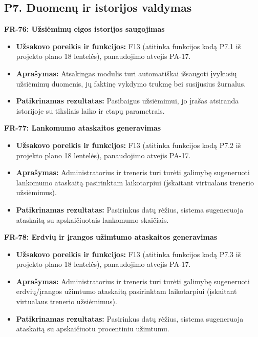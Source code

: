 \subsection{P7. Duomenų ir istorijos valdymas}

\vspace{0.3cm}
\noindent\textbf{FR-76: Užsiėmimų eigos istorijos saugojimas}
\begin{itemize}
    \item \textbf{Užsakovo poreikis ir funkcijos:} F13 (atitinka funkcijos kodą P7.1 iš projekto plano 18 lentelės), panaudojimo atvejis PA-17.
    \item \textbf{Aprašymas:} Atsakingas modulis turi automatiškai išsaugoti įvykusių užsiėmimų duomenis, jų faktinę vykdymo trukmę bei susijusius žurnalus.
    \item \textbf{Patikrinamas rezultatas:} Pasibaigus užsiėmimui, jo įrašas atsiranda istorijoje su tiksliais laiko ir etapų parametrais.
\end{itemize}

\vspace{0.3cm}
\noindent\textbf{FR-77: Lankomumo ataskaitos generavimas}
\begin{itemize}
    \item \textbf{Užsakovo poreikis ir funkcijos:} F13 (atitinka funkcijos kodą P7.2 iš projekto plano 18 lentelės), panaudojimo atvejis PA-17.
    \item \textbf{Aprašymas:} Administratorius ir treneris turi turėti galimybę sugeneruoti lankomumo ataskaitą pasirinktam laikotarpiui (įskaitant virtualaus trenerio užsiėmimus).
    \item \textbf{Patikrinamas rezultatas:} Pasirinkus datų rėžius, sistema sugeneruoja ataskaitą su apskaičiuotais lankomumo skaičiais.
\end{itemize}

\vspace{0.3cm}
\noindent\textbf{FR-78: Erdvių ir įrangos užimtumo ataskaitos generavimas}
\begin{itemize}
    \item \textbf{Užsakovo poreikis ir funkcijos:} F13 (atitinka funkcijos kodą P7.3 iš projekto plano 18 lentelės), panaudojimo atvejis PA-17.
    \item \textbf{Aprašymas:} Administratorius ir treneris turi turėti galimybę sugeneruoti erdvių/įrangos užimtumo ataskaitą pasirinktam laikotarpiui (įskaitant virtualaus trenerio užsiėmimus).
    \item \textbf{Patikrinamas rezultatas:} Pasirinkus datų rėžius, sistema sugeneruoja ataskaitą su apskaičiuotu procentiniu užimtumu.
\end{itemize}